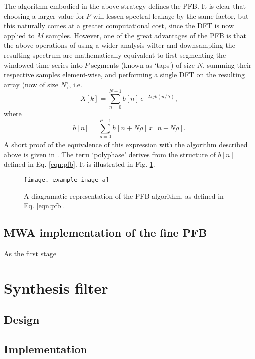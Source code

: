 \documentclass{pasa}%
\begin{document}
The algorithm embodied in the above strategy defines the PFB.
It is clear that choosing a larger value for $P$ will lessen spectral leakage by the same factor, but this naturally comes at a greater computational cost, since the DFT is now applied to $M$ samples.
However, one of the great advantages of the PFB is that the above operations of using a wider analysis wilter and downsampling the resulting spectrum are mathematically equivalent to first segmenting the windowed time series into $P$ segments (known as `taps') of size $N$, summing their respective samples element-wise, and performing a single DFT on the resulting array (now of size $N$), i.e.
\begin{equation}
    X[k] = \sum_{n=0}^{N-1} b[n]\,e^{-2\pi j k (n/N)},
    \label{eqn:pfb}
\end{equation}
where
\begin{equation*}
    b[n] = \sum_{\rho=0}^{P-1} h[n + N\rho]\,x[n + N\rho].
\end{equation*}
A short proof of the equivalence of this expression with the algorithm described above is given in \citet{Harris2011}.
The term `polyphase' derives from the structure of $b[n]$ defined in Eq. \eqref{eqn:pfb}.
It is illustrated in Fig. \ref{fig:pfb}.
\begin{figure}
    \centering
    \texttt{[image: example-image-a]}
    \caption{A diagramatic representation of the PFB algorithm, as defined in Eq. \eqref{eqn:pfb}.}
    \label{fig:pfb}
\end{figure}

\subsection{MWA implementation of the fine PFB}

As the first stage

\section{Synthesis filter}
\label{sec:ipfb}

\subsection{Design}

\subsection{Implementation}
\end{document}
